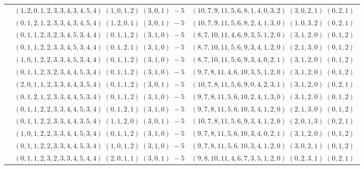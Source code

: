\documentclass[11pt]{article}
\begin{document}
\begin{longtable}[l]{|c|c|c|}
 \cline{2-3} 
 & $(1 ,2 ,0 ,1 ,2 ,3 ,3 ,4 ,3 ,4 ,5 ,4) \;(1 ,0 ,1 ,2) \;(3 ,0 ,1) \;-5$ & $(10 ,7 ,9 ,11 ,5 ,6 ,8 ,1 ,4 ,0 ,3 ,2) \;(3 ,0 ,2 ,1) \;(0 ,2 ,1) \;$\\ 
 \cline{2-3} 
 & $(0 ,1 ,2 ,1 ,2 ,3 ,3 ,4 ,3 ,4 ,5 ,4) \;(1 ,2 ,0 ,1) \;(3 ,0 ,1) \;-5$ & $(10 ,7 ,9 ,11 ,5 ,6 ,8 ,2 ,4 ,1 ,3 ,0) \;(1 ,0 ,3 ,2) \;(0 ,2 ,1) \;$\\ 
 \cline{2-3} 
 & $(0 ,1 ,1 ,2 ,3 ,2 ,3 ,4 ,5 ,3 ,4 ,4) \;(0 ,1 ,1 ,2) \;(3 ,1 ,0) \;-5$ & $(8 ,7 ,10 ,11 ,4 ,6 ,9 ,3 ,5 ,1 ,2 ,0) \;(3 ,1 ,2 ,0) \;(0 ,1 ,2) \;$\\ 
 \cline{2-3} 
 & $(0 ,1 ,1 ,2 ,2 ,3 ,3 ,4 ,5 ,3 ,4 ,4) \;(0 ,1 ,2 ,1) \;(3 ,1 ,0) \;-5$ & $(8 ,7 ,10 ,11 ,5 ,6 ,9 ,3 ,4 ,1 ,2 ,0) \;(2 ,1 ,3 ,0) \;(0 ,1 ,2) \;$\\ 
 \cline{2-3} 
 & $(1 ,0 ,1 ,2 ,2 ,3 ,3 ,4 ,5 ,3 ,4 ,4) \;(0 ,1 ,1 ,2) \;(3 ,1 ,0) \;-5$ & $(8 ,7 ,10 ,11 ,5 ,6 ,9 ,3 ,4 ,0 ,2 ,1) \;(3 ,1 ,2 ,0) \;(0 ,1 ,2) \;$\\ 
 \cline{2-3} 
 & $(0 ,1 ,1 ,2 ,3 ,2 ,3 ,4 ,4 ,5 ,3 ,4) \;(0 ,1 ,1 ,2) \;(3 ,1 ,0) \;-5$ & $(9 ,7 ,8 ,11 ,4 ,6 ,10 ,3 ,5 ,1 ,2 ,0) \;(3 ,1 ,2 ,0) \;(0 ,1 ,2) \;$\\ 
 \cline{2-3} 
 & $(2 ,0 ,1 ,1 ,2 ,3 ,3 ,4 ,4 ,3 ,5 ,4) \;(0 ,1 ,1 ,2) \;(3 ,0 ,1) \;-5$ & $(10 ,7 ,8 ,11 ,5 ,6 ,9 ,0 ,4 ,2 ,3 ,1) \;(3 ,1 ,2 ,0) \;(0 ,2 ,1) \;$\\ 
 \cline{2-3} 
 & $(0 ,1 ,2 ,1 ,2 ,3 ,3 ,4 ,4 ,5 ,3 ,4) \;(0 ,1 ,1 ,2) \;(3 ,1 ,0) \;-5$ & $(9 ,7 ,8 ,11 ,5 ,6 ,10 ,2 ,4 ,1 ,3 ,0) \;(3 ,1 ,2 ,0) \;(0 ,1 ,2) \;$\\ 
 \cline{2-3} 
 & $(0 ,1 ,1 ,2 ,2 ,3 ,3 ,4 ,4 ,5 ,3 ,4) \;(0 ,1 ,2 ,1) \;(3 ,1 ,0) \;-5$ & $(9 ,7 ,8 ,11 ,5 ,6 ,10 ,3 ,4 ,1 ,2 ,0) \;(2 ,1 ,3 ,0) \;(0 ,1 ,2) \;$\\ 
 \cline{2-3} 
 & $(0 ,1 ,1 ,2 ,2 ,3 ,3 ,4 ,4 ,3 ,5 ,4) \;(1 ,1 ,2 ,0) \;(3 ,0 ,1) \;-5$ & $(10 ,7 ,8 ,11 ,5 ,6 ,9 ,3 ,4 ,1 ,2 ,0) \;(2 ,0 ,1 ,3) \;(0 ,2 ,1) \;$\\ 
 \cline{2-3} 
 & $(1 ,0 ,1 ,2 ,2 ,3 ,3 ,4 ,4 ,5 ,3 ,4) \;(0 ,1 ,1 ,2) \;(3 ,1 ,0) \;-5$ & $(9 ,7 ,8 ,11 ,5 ,6 ,10 ,3 ,4 ,0 ,2 ,1) \;(3 ,1 ,2 ,0) \;(0 ,1 ,2) \;$\\ 
 \cline{2-3} 
 & $(0 ,1 ,1 ,2 ,2 ,3 ,3 ,4 ,4 ,5 ,3 ,4) \;(1 ,0 ,1 ,2) \;(3 ,1 ,0) \;-5$ & $(9 ,7 ,8 ,11 ,5 ,6 ,10 ,3 ,4 ,1 ,2 ,0) \;(3 ,0 ,2 ,1) \;(0 ,1 ,2) \;$\\ 
 \cline{2-3} 
 & $(0 ,1 ,1 ,2 ,3 ,2 ,3 ,3 ,4 ,5 ,4 ,4) \;(2 ,0 ,1 ,1) \;(3 ,0 ,1) \;-5$ & $(9 ,8 ,10 ,11 ,4 ,6 ,7 ,3 ,5 ,1 ,2 ,0) \;(0 ,2 ,3 ,1) \;(0 ,2 ,1) \;$\\ 

\end{longtable}
\end{document}
